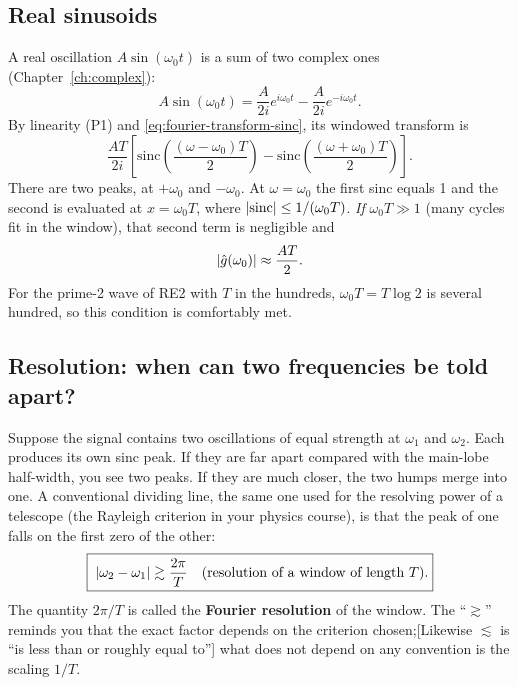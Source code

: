 \subsection{Real sinusoids}

A real oscillation $A\sin(\omega_0t)$ is a sum of two complex ones (Chapter~\ref{ch:complex}):
\[A\sin(\omega_0t)=\frac{A}{2i}e^{i\omega_0t}-\frac{A}{2i}e^{-i\omega_0t}.\]
By linearity (P1) and \eqref{eq:fourier-transform-sinc}, its windowed transform is
\begin{equation}
\frac{AT}{2i}\left[\mathrm{sinc}\!\left(\frac{(\omega-\omega_0)T}{2}\right)-\mathrm{sinc}\!\left(\frac{(\omega+\omega_0)T}{2}\right)\right].
\label{eq:fourier-transform-realsin}
\end{equation}
There are two peaks, at $+\omega_0$ and $-\omega_0$. At $\omega=\omega_0$ the first sinc equals 1 and the second is evaluated at $x=\omega_0T$, where $\left\lvert \mathrm{sinc}\right\rvert\le1/(\omega_0 T)$. \emph{If} $\omega_0T\gg1$ (many cycles fit in the window), that second term is negligible and
\begin{equation}
\left\lvert \hat g(\omega_0)\right\rvert\approx\frac{AT}{2}.
\label{eq:fourier-transform-AT2}
\end{equation}
For the prime-2 wave of RE2 with $T$ in the hundreds, $\omega_0T=T\log2$ is several hundred, so this condition is comfortably met.

\subsection{Resolution: when can two frequencies be told apart?}

Suppose the signal contains two oscillations of equal strength at $\omega_1$ and $\omega_2$. Each produces its own sinc peak. If they are far apart compared with the main-lobe half-width, you see two peaks. If they are much closer, the two humps merge into one. A conventional dividing line, the same one used for the resolving power of a telescope (the Rayleigh criterion in your physics course), is that the peak of one falls on the first zero of the other:
\begin{equation}
\boxed{\;\left\lvert \omega_2-\omega_1\right\rvert\gtrsim\frac{2\pi}{T}\quad\text{(resolution of a window of length }T).}
\label{eq:fourier-transform-resolution}
\end{equation}
The quantity $2\pi/T$ is called the \textbf{Fourier resolution} of the window. The ``$\gtrsim$'' reminds you that the exact factor depends on the criterion chosen;[Likewise $\lesssim$ is ``is less than or roughly equal to''] what does not depend on any convention is the scaling $1/T$.

